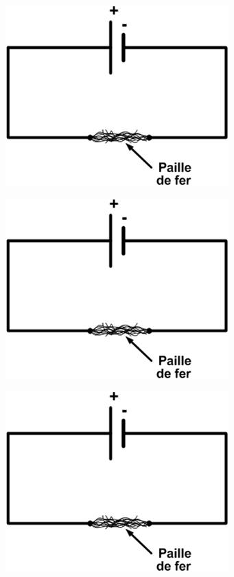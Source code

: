 \documentclass[12pt,a4paper]{article}
\begin{document}
\begin{multicols}{2}
\begin{center}
	\includegraphics[scale=0.45]{img/courtcircuit}
\end{center}

\begin{center}
	\includegraphics[scale=0.45]{img/courtcircuit}
\end{center}

\begin{center}
	\includegraphics[scale=0.45]{img/courtcircuit}
\end{center}


\end{multicols}
\end{document}
